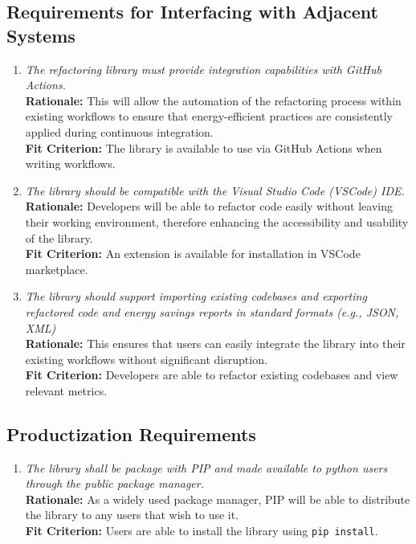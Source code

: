 \documentclass[12pt]{article}
\begin{document}
\subsection{Requirements for Interfacing with Adjacent Systems}
\begin{enumerate}[label=OER-IAS \arabic*., wide=0pt, leftmargin=*]
	\item \emph{The refactoring library must provide integration capabilities with GitHub Actions.}\\
    {\bf Rationale:} This will allow the automation of the refactoring process within existing workflows to ensure that energy-efficient practices are consistently applied during continuous integration.\\
    {\bf Fit Criterion:} The library is available to use via GitHub Actions when writing workflows.
  \item \emph{The library should be compatible with the Visual Studio Code (VSCode) IDE.}\\
    {\bf Rationale:} Developers will be able to refactor code easily without leaving their working environment, therefore enhancing the accessibility and usability of the library.\\
    {\bf Fit Criterion:} An extension is available for installation in VSCode marketplace.
  \item \emph{The library should support importing existing codebases and exporting refactored code and energy savings reports in standard formats (e.g., JSON, XML)}\\
    {\bf Rationale:} This ensures that users can easily integrate the library into their existing workflows without significant disruption.\\
    {\bf Fit Criterion:} Developers are able to refactor existing codebases and view relevant metrics.
\end{enumerate}

\subsection{Productization Requirements}
\begin{enumerate}[label=OER-PR \arabic*., wide=0pt, leftmargin=*]
	\item \emph{The library shall be package with PIP and made available to python users through the public package manager.}\\
    {\bf Rationale:} As a widely used package manager, PIP will be able to distribute the library to any users that wish to use it.\\
    {\bf Fit Criterion:} Users are able to install the library using \texttt{pip install}. 
\end{enumerate}
\end{document}
